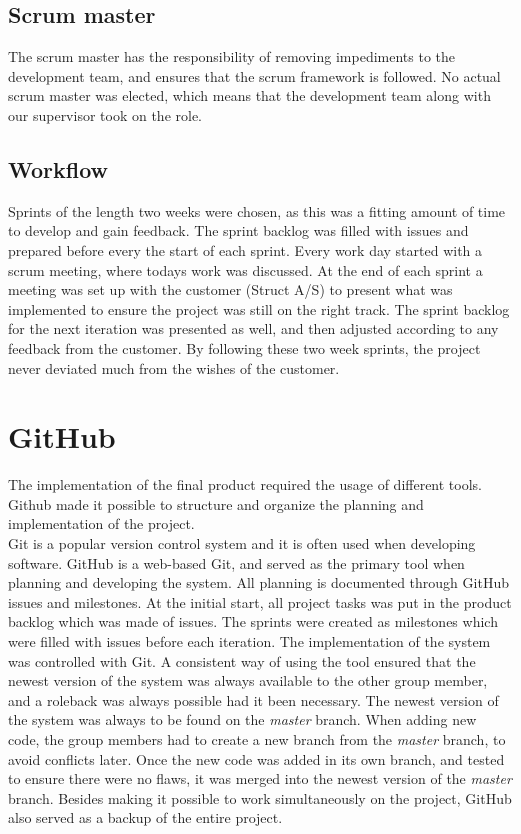 \subsection{Scrum master}
The scrum master has the responsibility of removing impediments to the development team, and ensures that the scrum framework is followed. No actual scrum master was elected, which means that the development team along with our supervisor took on the role.

\subsection{Workflow}
Sprints of the length two weeks were chosen, as this was a fitting amount of time to develop and gain feedback. The sprint backlog was filled with issues and prepared before every the start of each sprint. Every work day started with a scrum meeting, where todays work was discussed. At the end of each sprint a meeting was set up with the customer (Struct A/S) to present what was implemented to ensure the project was still on the right track. The sprint backlog for the next iteration was presented as well, and then adjusted according to any feedback from the customer.
By following these two week sprints, the project never deviated much from the wishes of the customer.


\section{GitHub}
The implementation of the final product required the usage of different tools. Github made it possible to structure and organize the planning and implementation of the project.\\

Git is a popular version control system and it is often used when developing software. GitHub is a web-based Git, and served as the primary tool when planning and developing the system. All planning is documented through GitHub issues and milestones. At the initial start, all project tasks was put in the product backlog which was made of issues. The sprints were created as milestones which were filled with issues before each iteration.
The implementation of the system was controlled with Git. A consistent way of using the tool ensured that the newest version of the system was always available to the other group member, and a roleback was always possible had it been necessary. The newest version of the system was always to be found on the \textit{master} branch. When adding new code, the group members had to create a new branch from the \textit{master} branch, to avoid conflicts later. Once the new code was added in its own branch, and tested to ensure there were no flaws, it was merged into the newest version of the \textit{master} branch.
Besides making it possible to work simultaneously on the project, GitHub also served as a backup of the entire project.
